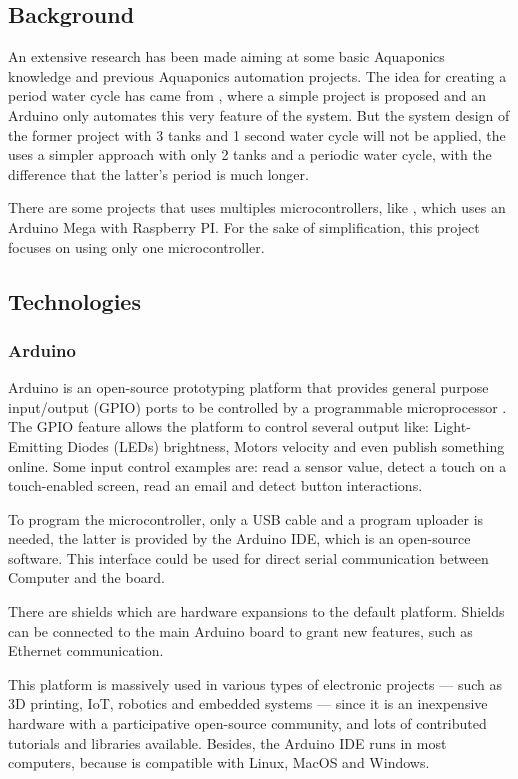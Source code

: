 \subsection{Background}

An extensive research has been made aiming at some basic Aquaponics knowledge and previous Aquaponics automation projects.
The idea for creating a period water cycle has came from \cite{simpleArduinoAquaponics},
where a simple project is proposed and an Arduino only automates this very feature of the system.
But the system design of the former project with 3 tanks and 1 second water cycle will not be applied,
the \cite{Kretzinger2015} uses a simpler approach with only 2 tanks and a periodic water cycle,
with the difference that the latter's period is much longer.

There are some projects that uses multiples microcontrollers,
like \cite{GarethColeman2014},
which uses an Arduino Mega with Raspberry PI.
For the sake of simplification,
this project focuses on using only one microcontroller.

\subsection{Technologies}
\subsubsection{Arduino}
Arduino is an open-source prototyping platform that provides general purpose input/output (GPIO) ports to be controlled by a programmable microprocessor \cite{arduino_intro}.
The GPIO feature allows the platform to control several output like: Light-Emitting Diodes (LEDs) brightness,
Motors velocity and even publish something online.
Some input control examples are: read a sensor value,
detect a touch on a touch-enabled screen, 
read an email and detect button interactions.

To program the microcontroller,
only a USB cable and a program uploader is needed,
the latter is provided by the Arduino IDE,
which is an open-source software.
This interface could be used for direct serial communication between Computer and the board.

There are shields which are hardware expansions to the default platform.
Shields can be connected to the main Arduino board to grant new features,
such as Ethernet communication.

This platform is massively used in various types of electronic projects ---
such as 3D printing, IoT, robotics and embedded systems ---
since it is an inexpensive hardware with a participative open-source community,
and lots of contributed tutorials and libraries available.
Besides,
the Arduino IDE runs in most computers,
because is compatible with Linux, MacOS and Windows.

